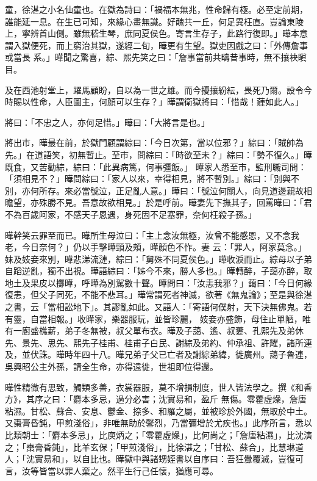 \begin{pinyinscope}
 童，徐湛之小名仙童也。在獄為詩曰：「禍福本無兆，性命歸有極。必至定前期，誰能延一息。在生已可知，來緣心畫無識。好醜共一丘，何足異枉直。豈論東陵上，寧辨首山側。雖無嵇生琴，庶同夏侯色。寄言生存子，此路行復即。」曄本意謂入獄便死，而上窮治其獄，遂經二旬，曄更有生望。獄吏因戲之曰：「外傳詹事或當長
 系。」曄聞之驚喜，綜、熙先笑之曰：「詹事當前共疇昔事時，無不攘袂瞋目。



 及在西池射堂上，躍馬顧盼，自以為一世之雄。而今擾攘紛紜，畏死乃爾。設令今時賜以性命，人臣圖主，何顏可以生存？」曄謂衛獄將曰：「惜哉！薶如此人。」



 將曰：「不忠之人，亦何足惜。」曄曰：「大將言是也。」



 將出市，曄最在前，於獄門顧謂綜曰：「今日次第，當以位邪？」綜曰：「賊帥為先。」在道語笑，初無暫止。至市，問綜曰：「時欲至未？」綜曰：「勢不復久。」曄既食，又苦勸綜，綜曰：「此異病篤，何事彊飯。」
 曄家人悉至市，監刑職司問：「須相見不？」曄問綜曰：「家人以來，幸得相見，將不暫別。」綜曰：「別與不別，亦何所存。來必當號泣，正足亂人意。」曄曰：「號泣何關人，向見道邊親故相瞻望，亦殊勝不見。吾意故欲相見。」於是呼前。曄妻先下撫其子，回罵曄曰：「君不為百歲阿家，不感天子恩遇，身死固不足塞罪，奈何枉殺子孫。」



 曄幹笑云罪至而已。曄所生母泣曰：「主上念汝無極，汝曾不能感恩，又不念我老，今日奈何？」仍以手擊曄頸及頰，曄顏色不怍。妻
 云：「罪人，阿家莫念。」妹及妓妾來別，曄悲涕流漣，綜曰：「舅殊不同夏侯色。」曄收淚而止。綜母以子弟自蹈逆亂，獨不出視。曄語綜曰：「姊今不來，勝人多也。」曄轉醉，子藹亦醉，取地土及果皮以擲曄，呼曄為別駕數十聲。曄問曰：「汝恚我邪？」藹曰：「今日何緣復恚，但父子同死，不能不悲耳。」曄常謂死者神滅，欲著《無鬼論》；至是與徐湛之書，云「當相訟地下」。其謬亂如此。又語人：「寄語何僕射，天下決無佛鬼。若有靈，自當相報。」收曄家，樂器服玩，並皆珍麗，
 妓妾亦盛飾，母住止單陋，唯有一廚盛樵薪，弟子冬無被，叔父單布衣。曄及子藹、遙、叔蔞、孔熙先及弟休先、景先、思先、熙先子桂甫、桂甫子白民、謝綜及弟約、仲承祖、許耀，諸所連及，並伏誅。曄時年四十八。曄兄弟子父已亡者及謝綜弟緯，徙廣州。藹子魯連，吳興昭公主外孫，請全生命，亦得遠徙，世祖即位得還。



 曄性精微有思致，觸類多善，衣裳器服，莫不增損制度，世人皆法學之。撰《和香方》，其序之曰：「麝本多忌，過分必害；沈實易和，盈斤
 無傷。零藿虛燥，詹唐粘濕。甘松、蘇合、安息、鬱金、捺多、和羅之屬，並被珍於外國，無取於中土。又棗膏昏鈍，甲煎淺俗」，非唯無助於馨烈，乃當彌增於尤疾也。」此序所言，悉以比類朝士：「麝本多忌」，比庾炳之；「零藿虛燥」，比何尚之；「詹唐粘濕」，比沈演之；「棗膏昏鈍」，比羊玄保；「甲煎淺俗」，比徐湛之；「甘松、蘇合」，比慧琳道人；「沈實易和」，以自比也。曄獄中與諸甥姪書以自序曰：吾狂釁覆滅，豈復可言，汝等皆當以罪人棄之。然平生行己任懷，猶應可尋。




\end{pinyinscope}
